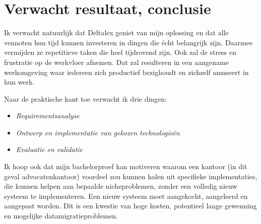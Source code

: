 \section{Verwacht resultaat, conclusie}%
\label{sec:verwachte_resultaten}
Ik verwacht natuurlijk dat Deltalex geniet van mijn oplossing en dat alle vennoten hun tijd kunnen investeren in dingen die écht belangrijk zijn. Daarmee vermijden ze repetitieve taken die heel tijdrovend zijn. Ook zal de stress en frustratie op de werkvloer afnemen. Dat zal resulteren in een aangename werkomgeving waar iedereen zich productief bezighoudt en zichzelf amuseert in hun werk.

Naar de praktische kant toe verwacht ik drie dingen:
\begin{itemize}
        \item \emph{Requirementsanalyse}
        \item \emph{Ontwerp en implementatie van gekozen technologieën}
        \item \emph{Evaluatie en validatie}
\end{itemize}

Ik hoop ook dat mijn bachelorproef kan motiveren waarom een kantoor (in dit geval advocatenkantoor) voordeel zou kunnen halen uit specifieke implementaties, die kunnen helpen aan bepaalde nicheproblemen, zonder een volledig nieuw systeem te implementeren. Een nieuw systeem moet aangekocht, aangeleerd en aangepast worden. Dit is een kwestie van hoge kosten, potentieel lange gewenning en mogelijke datamigratieproblemen. 
